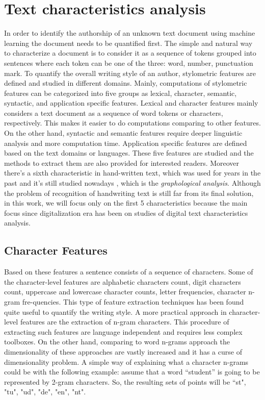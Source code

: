 \chapter{Text characteristics analysis}
In order to identify the authorship of an unknown text document using machine learning the document needs to be quantified first. The simple and natural way to characterize a document is to consider it as a sequence of tokens grouped into sentences where each token can be one of the three: word, number, punctuation mark.
To quantify the overall writing style of an author, stylometric features are defined and studied in different domains. Mainly, computations of stylometric features can be categorized into five groups as lexical, character, semantic, syntactic, and application specific features. Lexical and character features mainly considers a text document as a sequence of word tokens or characters, respectively. This makes it easier to do computations comparing to other features. On the other hand, syntactic and semantic features require deeper linguistic analysis and more computation time. Application specific features are defined based on the text domains or languages. These five features are studied and the methods to extract them are also provided for interested readers.
Moreover there's a sixth characteristic in hand-written text, which was used for years in the past and it's still studied nowadays \cite{mironovsky2018graphological}, which is the \textit{graphological analysis}.
Although the problem of recognition of handwriting text is still far from its final solution, in this work, we will focus only on the first 5 characteristics because the main focus since digitalization era has been on studies of digital text characteristics analysis.

\section{Character Features}

Based on these features a sentence consists of a sequence of characters. Some of the character-level features are alphabetic characters count, digit characters count, uppercase and lowercase character counts, letter frequencies, character n-gram fre-quencies. This type of feature extraction techniques has been found quite useful to quantify the writing style.\cite{grieve2007quantitative}
A more practical approach in character-level features are the extraction of n-gram characters. This procedure of extracting such features are language independent and requires less complex toolboxes. On the other hand, comparing to word n-grams approach the dimensionality of these approaches are vastly increased and it has a curse of dimensionality problem. A simple way of explaining what a character n-grams could be with the following example: assume that a word “student” is going to be represented by 2-gram characters. So, the resulting sets of points will be {“st", "tu", "ud", "de", "en", "nt"}.\\\\

